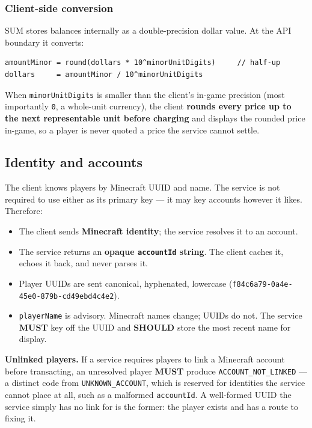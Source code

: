 \documentclass[11pt,a4paper]{article}
\newcommand{\code}[1]{\texttt{\small #1}}
\newcommand{\req}{\textbf{MUST}}
\newcommand{\rec}{\textbf{SHOULD}}
\begin{document}
\subsubsection*{Client-side conversion}

SUM stores balances internally as a double-precision dollar value. At the API boundary it converts:

\begin{lstlisting}[style=http]
amountMinor = round(dollars * 10^minorUnitDigits)     // half-up
dollars     = amountMinor / 10^minorUnitDigits
\end{lstlisting}

When \code{minorUnitDigits} is smaller than the client's in-game precision (most importantly
\code{0}, a whole-unit currency), the client \textbf{rounds every price up to the next
representable unit before charging} and displays the rounded price in-game, so a player is never
quoted a price the service cannot settle.

\subsection{Identity and accounts}
\label{sec:identity}

The client knows players by Minecraft UUID and name. The service is not required to use either as
its primary key --- it may key accounts however it likes. Therefore:

\begin{itemize}
\item The client sends \textbf{Minecraft identity}; the service resolves it to an account.
\item The service returns an \textbf{opaque \code{accountId} string}. The client caches it, echoes
      it back, and never parses it.
\item Player UUIDs are sent canonical, hyphenated, lowercase
      (\code{f84c6a79-0a4e-45e0-879b-cd49ebd4c4e2}).
\item \code{playerName} is advisory. Minecraft names change; UUIDs do not. The service \req{} key
      off the UUID and \rec{} store the most recent name for display.
\end{itemize}

\textbf{Unlinked players.} If a service requires players to link a Minecraft account before
transacting, an unresolved player \req{} produce \code{ACCOUNT\_NOT\_LINKED} --- a distinct code
from \code{UNKNOWN\_ACCOUNT}, which is reserved for identities the service cannot place at all,
such as a malformed \code{accountId}. A well-formed UUID the service simply has no link for is
the former: the player exists and has a route to fixing it.
\end{document}
